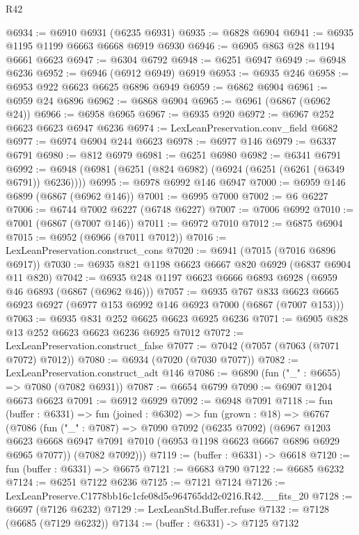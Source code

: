 \begin{lexlean}{R42}
\begin{coremodule}
{@6934 := @6910 @6931 (@6235 @6931)
@6935 := @6828 @6904
@6941 := @6935 @1195 @1199 @6663 @6668 @6919 @6930
@6946 := @6905 @863 @28 @1194 @6661 @6623
@6947 := @6304 @6792
@6948 := @6251 @6947
@6949 := @6948 @6236
@6952 := @6946 (@6912 @6949) @6919
@6953 := @6935 @246
@6958 := @6953 @922 @6623 @6625 @6896 @6949
@6959 := @6862 @6904
@6961 := @6959 @24 @6896
@6962 := @6868 @6904
@6965 := @6961 (@6867 (@6962 @24))
@6966 := @6958 @6965
@6967 := @6935 @920
@6972 := @6967 @252 @6623 @6623 @6947 @6236
@6974 := LexLeanPreservation.conv_field @6682
@6977 := @6974 @6904 @244 @6623
@6978 := @6977 @146
@6979 := @6337 @6791
@6980 := @812 @6979
@6981 := @6251 @6980
@6982 := @6341 @6791
@6992 := @6948 (@6981 (@6251 (@824 @6982) (@6924 (@6251 (@6261 (@6349 @6791)) @6236))))
@6995 := @6978 @6992 @146 @6947
@7000 := @6959 @146 @6899 (@6867 (@6962 @146))
@7001 := @6995 @7000
@7002 := @6 @6227
@7006 := @6744 @7002 @6227 (@6748 @6227)
@7007 := @7006 @6992
@7010 := @7001 (@6867 (@7007 @146))
@7011 := @6972 @7010
@7012 := @6875 @6904
@7015 := @6952 (@6966 (@7011 @7012))
@7016 := LexLeanPreservation.construct_cons
@7020 := @6941 (@7015 (@7016 @6896 @6917))
@7030 := @6935 @821 @1198 @6623 @6667 @820 @6929 (@6837 @6904 @11 @820)
@7042 := @6935 @248 @1197 @6623 @6666 @6893 @6928 (@6959 @46 @6893 (@6867 (@6962 @46)))
@7057 := @6935
    @767
    @833
    @6623
    @6665
    @6923
    @6927
    (@6977 @153 @6992 @146 @6923 @7000 (@6867 (@7007 @153)))
@7063 := @6935 @831 @252 @6625 @6623 @6925 @6236
@7071 := @6905 @828 @13 @252 @6623 @6623 @6236 @6925 @7012
@7072 := LexLeanPreservation.construct_false
@7077 := @7042 (@7057 (@7063 (@7071 @7072) @7012))
@7080 := @6934 (@7020 (@7030 @7077))
@7082 := LexLeanPreservation.construct_adt @146
@7086 := @6890 (fun ("_" : @6655) => @7080 (@7082 @6931))
@7087 := @6654 @6799
@7090 := @6907 @1204 @6673 @6623
@7091 := @6912 @6929
@7092 := @6948 @7091
@7118 := fun (buffer : @6331) =>
  fun (joined : @6302) =>
  fun (grown : @18) =>
  @6767
    (@7086
      (fun ("_" : @7087) =>
      @7090
        @7092
        (@6235 @7092)
        (@6967
          @1203
          @6623
          @6668
          @6947
          @7091
          @7010
          (@6953 @1198 @6623 @6667 @6896 @6929 @6965 @7077))
        (@7082 @7092)))
@7119 := (buffer : @6331) -> @6618
@7120 := fun (buffer : @6331) => @6675
@7121 := @6683 @790
@7122 := @6685 @6232
@7124 := @6251 @7122 @6236
@7125 := @7121 @7124
@7126 := LexLeanPreserve.C1778bb16c1cfe08d5e964765dd2c0216.R42.__fits_20
@7128 := @6697 (@7126 @6232)
@7129 := LexLeanStd.Buffer.refuse
@7132 := @7128 (@6685 (@7129 @6232))
@7134 := (buffer : @6331) -> @7125 @7132
}
\end{coremodule}
\end{lexlean}
